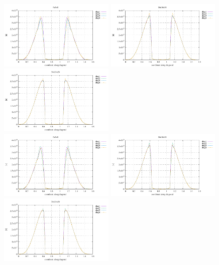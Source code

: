 \begin{center}
\includegraphics[width=5.5cm]{python_codes/fieldstone_82/RESULTS/bench4/u_08}
\includegraphics[width=5.5cm]{python_codes/fieldstone_82/RESULTS/bench4/u_16}
\includegraphics[width=5.5cm]{python_codes/fieldstone_82/RESULTS/bench4/u_24}\\
\includegraphics[width=5.5cm]{python_codes/fieldstone_82/RESULTS/bench4/v_08}
\includegraphics[width=5.5cm]{python_codes/fieldstone_82/RESULTS/bench4/v_16}
\includegraphics[width=5.5cm]{python_codes/fieldstone_82/RESULTS/bench4/v_24}\\

\end{center}
